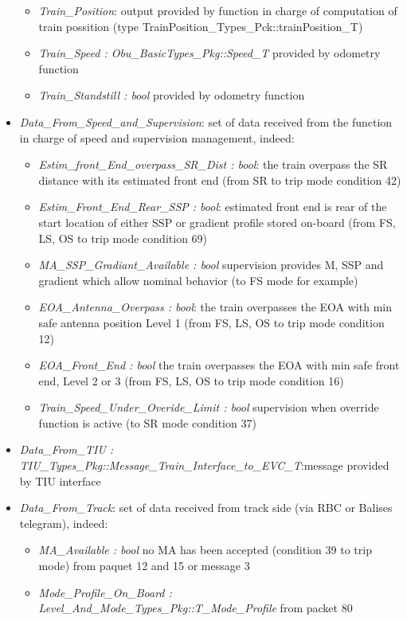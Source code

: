 \begin{itemize}
\begin{itemize}
\item \emph{Train\_Position}: output provided by function in charge of computation of train possition (type	TrainPosition\_Types\_Pck::trainPosition\_T)	\item \emph{Train\_Speed : Obu\_BasicTypes\_Pkg::Speed\_T} provided by odometry function
\item \emph{Train\_Standstill : bool} provided by odometry function
\end{itemize}
\item \emph{Data\_From\_Speed\_and\_Supervision}: set of data received from the function in charge of speed and supervision management, indeed:
\begin{itemize}
\item \emph{Estim\_front\_End\_overpass\_SR\_Dist : bool}: the train overpass the SR distance with its estimated front end (from SR to trip mode condition 42) 
\item \emph{Estim\_Front\_End\_Rear\_SSP : bool}: estimated front end is rear of the start location of either SSP or gradient profile stored on-board (from FS, LS, OS to trip mode condition 69)
\item \emph{MA\_SSP\_Gradiant\_Available : bool} supervision provides M, SSP and gradient which allow nominal behavior (to FS mode for example)
\item \emph{EOA\_Antenna\_Overpass : bool}: the train overpasses the  EOA  with min safe antenna position Level 1 (from FS, LS, OS to trip mode condition 12)
\item \emph{EOA\_Front\_End : bool} the train overpasses the  EOA  with min safe front end, Level 2 or 3 (from FS, LS, OS to trip mode condition 16)
\item \emph{Train\_Speed\_Under\_Overide\_Limit : bool} supervision when override function is active (to SR mode condition 37)
\end{itemize}
\item \emph{Data\_From\_TIU : TIU\_Types\_Pkg::Message\_Train\_Interface\_to\_EVC\_T}:message provided by TIU interface
\item \emph{Data\_From\_Track}: set of data received from track side (via RBC or Balises telegram), indeed:
\begin{itemize}
\item \emph{MA\_Available : bool} no MA has been accepted (condition 39 to trip mode) from paquet 12 and 15 or message 3
\item \emph{Mode\_Profile\_On\_Board : Level\_And\_Mode\_Types\_Pkg::T\_Mode\_Profile} from packet 80

\end{itemize}
\end{itemize}
